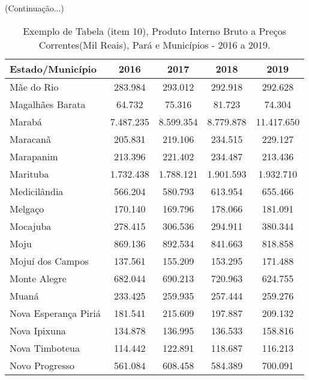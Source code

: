 \newpage
\begin{table}[!htb]
    \centering
    {
    \caption{Exemplo de Tabela (item 10), Produto Interno Bruto a Preços Correntes(Mil Reais), Pará e Municípios - 2016 a 2019.}  (Continuação...)
    \label{item 10 regras3}
    \vspace{0.1cm}
\begin{tabular}{l|c|c|c|c}
  \hline\hline
  Estado/Município        &    2016    &    2017    &  2018      &  2019    \\
  \hline\hline
   Mãe do Rio             &  283.984   &  293.012   &  292.918   & 292.628   \\
   Magalhães Barata       &  64.732    &  75.316    &  81.723    & 74.304    \\
   Marabá                 &  7.487.235 &  8.599.354 &  8.779.878 & 11.417.650 \\
   Maracanã               & 205.831    &  219.106   &  234.515   & 229.127    \\ 
   Marapanim              & 213.396    &  221.402   &  234.487   & 213.436    \\
   Marituba               & 1.732.438  & 1.788.121  &  1.901.593 &  1.932.710  \\
   Medicilândia           & 566.204    & 580.793    &  613.954   &  655.466    \\
   Melgaço                & 170.140    & 169.796    &  178.066   &  181.091     \\
   Mocajuba               & 278.415    & 306.536    &  294.911   &   380.344     \\
   Moju                   & 869.136    & 892.534    & 841.663    & 818.858      \\
   Mojuí dos Campos       & 137.561    & 155.209    & 153.295    & 171.488      \\
   Monte Alegre           & 682.044    & 690.213    & 720.963    & 624.755      \\
   Muaná                  & 233.425    &  259.935   & 257.444    &  259.276     \\
   Nova Esperança Piriá   & 181.541    &  215.609   & 197.887    &  209.132     \\
   Nova Ipixuna           & 134.878    &  136.995   & 136.533    &  158.816    \\
   Nova Timboteua         & 114.442    &  122.891   & 118.687    & 116.213     \\
   Novo Progresso         & 561.084    &  608.458   & 584.389    & 700.091      \\

\end{tabular}}
\end{table}
